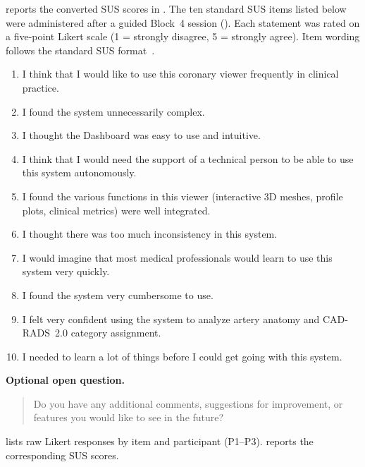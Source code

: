  reports the converted SUS scores in . The ten standard SUS items listed below were administered after a guided Block~4 session (). Each statement was rated on a five-point Likert scale (1 = strongly disagree, 5 = strongly agree). Item wording follows the standard SUS format~\cite{brooke1996}.

\begin{enumerate}
  \item I think that I would like to use this coronary viewer frequently in clinical practice.
  \item I found the system unnecessarily complex.
  \item I thought the Dashboard was easy to use and intuitive.
  \item I think that I would need the support of a technical person to be able to use this system autonomously.
  \item I found the various functions in this viewer (interactive 3D meshes, profile plots, clinical metrics) were well integrated.
  \item I thought there was too much inconsistency in this system.
  \item I would imagine that most medical professionals would learn to use this system very quickly.
  \item I found the system very cumbersome to use.
  \item I felt very confident using the system to analyze artery anatomy and CAD-RADS~2.0 category assignment.
  \item I needed to learn a lot of things before I could get going with this system.
\end{enumerate}

\textbf{Optional open question.}
\begin{quote}
  Do you have any additional comments, suggestions for improvement, or features you would like to see in the future?
\end{quote}

 lists raw Likert responses by item and participant (P1--P3).  reports the corresponding SUS scores.

